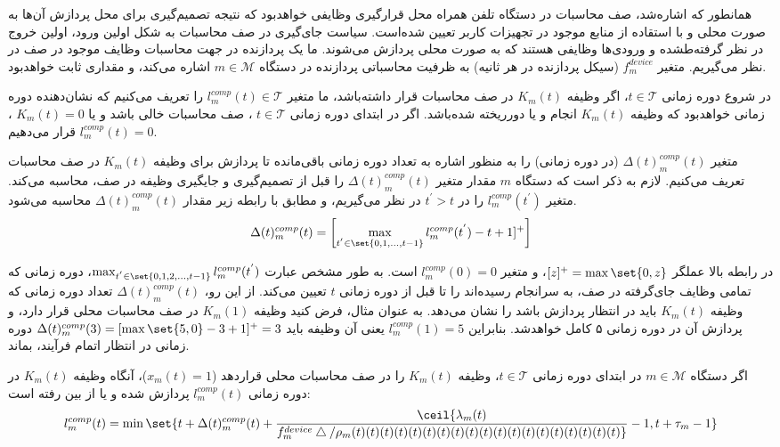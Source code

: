 

همانطور که اشاره‌شد، صف محاسبات در دستگاه تلفن همراه محل قرارگیری وظایفی خواهدبود که نتیجه تصمیم‌گیری برای محل پردازش آن‌ها به صورت محلی و با استقاده از منابع موجود در تجهیزات کاربر تعیین شده‌است. سیاست جای‌گیری در صف محاسبات به شکل اولین ورود، اولین خروج در نظر گرفته‌طشده‌ و ورودی‌ها وظایفی هستند که به صورت محلی پردازش می‌شوند. ما یک پردازنده در جهت محاسبات وظایف موجود در صف در نظر می‌گیریم. متغیر $f_m^{device}$ (سیکل پردازنده در هر ثانیه) به ظرفیت محاسباتی پردازنده در دستگاه $m \in \mathcal{M}$ اشاره می‌کند، و مقداری  ثابت خواهدبود.      

در شروع دوره زمانی $t \in \mathcal{T}$، اگر وظیفه $K_m(t)$ در صف محاسبات قرار داشته‌باشد، ما متغیر $l_m^{comp}(t) \in \mathcal{T}$ را تعریف می‌کنیم که نشان‌دهنده دوره زمانی خواهدبود که وظیفه $K_m(t)$ انجام و یا دورریخته شده‌باشد. اگر در ابتدای دوره زمانی $t \in \mathcal{T}$ ، صف محاسبات خالی باشد و یا $K_m(t)=0$ ،  $l_m^{comp}(t) = 0$ قرار می‌دهیم. 

متغیر $\Delta(t)_m^{comp}(t)$ (در دوره زمانی) را به منظور اشاره به تعداد دوره زمانی باقی‌مانده تا پردازش برای وظیفه $K_m(t)$ در صف محاسبات تعریف می‌کنیم. لازم به ذکر است که دستگاه $m$ مقدار متغیر $\Delta(t)_m^{comp}(t)$ را قبل از تصمیم‌گیری و جایگیری وظیفه در صف، محاسبه می‌کند. متغیر $l_m^{comp}(t^{'})$ را در $t^{'} > t$ در نظر می‌گیریم، و مطابق با رابطه زیر مقدار $\Delta(t)_m^{comp}(t)$ محاسبه می‌شود. 
\begin{alignat}{2}
	\Delta(t)_m^{comp}(t) = \left[ \max\limits_{t^{'} \in \set{0,1,\ldots,t-1}} l_m^{comp}(t^{'})-t+1]^+ \right]
	\label{2}  
\end{alignat}



در رابطه بالا عملگر $[z]^+ = \max \set{0,z}$، و متغیر $l_m^{comp}(0) = 0$ است. به طور مشخص عبارت $\max_{t^{'} \in \set{0,1,2,\ldots, t-1}}l_m^{comp}(t^{'})$، دوره زمانی که تمامی وظایف جای‌گرفته در صف، به سرانجام رسیده‌اند را تا قبل از دوره زمانی $t$ تعیین می‌کند. از این رو، $\Delta(t)_m^{comp}(t)$ تعداد دوره زمانی که وظیفه $K_m(t)$ باید در انتظار پردازش باشد را نشان می‌دهد. به عنوان مثال، فرض کنید وظیفه $K_m(1)$ در صف محاسبات محلی قرار دارد، و پردازش آن در دوره زمانی ۵ کامل خواهدشد. بنابراین $l_m^{comp}(1) = 5$ یعنی آن وظیفه باید $\Delta(t)_m^{comp}(3) = [\max \set{5,0}-3+1]^+ = 3$ دوره زمانی در انتظار اتمام فرآیند، بماند.

اگر دستگاه $m \in \mathcal{M}$  در ابتدای دوره زمانی $t \in \mathcal{T}$، وظیفه $K_m(t)$ را در صف محاسبات محلی قراردهد ($x_m(t) = 1$)، آنگاه وظیفه $K_m(t)$ در دوره زمانی $l_m^{comp}(t)$ پردازش شده و یا از بین رفته است:  
\begin{alignat}{2}
	l_m^{comp}(t) = \min \set{t + \Delta(t)_m^{comp}(t) + \ceil{\lambda_m(t) \over f_m^{device} \bigtriangleup / \rho_m(t)(t)(t)(t)(t)(t)(t)(t)(t)(t)(t)(t)(t)(t)(t)(t)(t)(t)(t)} - 1, t + \tau_m - 1}
	\label{3}  
\end{alignat}



